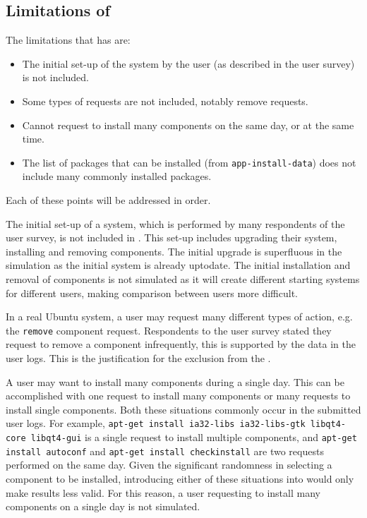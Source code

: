 \subsection{Limitations of \usermodel}
The limitations that \usermodel has are:
\begin{itemize}
  \item The initial set-up of the system by the user (as described in the user survey) is not included.
  \item Some types of requests are not included, notably remove requests.
  \item Cannot request to install many components on the same day, or at the same time.
  \item The list of packages that can be installed (from \texttt{app-install-data}) does not include many commonly installed packages.
\end{itemize}
Each of these points will be addressed in order.

The initial set-up of a system, which is performed by many respondents of the user survey, is not included in \usermodel.
This set-up includes upgrading their system, installing and removing components.
The initial upgrade is superfluous in the simulation as the initial system is already uptodate.
The initial installation and removal of components is not simulated as it will create different starting systems for different users,
making comparison between users more difficult.

In a real Ubuntu system, a user may request many different types of action, e.g. the \texttt{remove} component request.
Respondents to the user survey stated they request to remove a component infrequently, this is supported by the data in the user logs.
This is the justification for the exclusion from the \usermodel.

A user may want to install many components during a single day.
This can be accomplished with one request to install many components or many requests to install single components.
Both these situations commonly occur in the submitted user logs.
For example, \texttt{apt-get install ia32-libs ia32-libs-gtk libqt4-core libqt4-gui} is a single request to install multiple components,
and  \texttt{apt-get install autoconf} and \texttt{apt-get install checkinstall} are two requests performed on the same day.
Given the significant randomness in selecting a component to be installed, introducing either of these situations into \usermodel would only make results less valid.
For this reason, a user requesting to install many components on a single day is not simulated.

